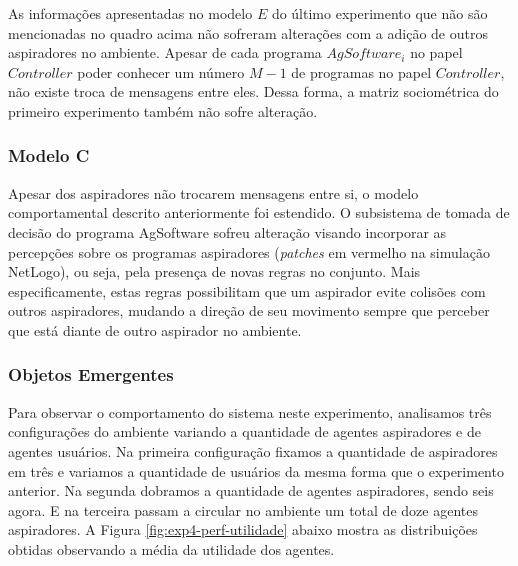 As informações apresentadas no modelo $E$ do último experimento que não são mencionadas no quadro acima não sofreram alterações com a adição  de outros aspiradores no ambiente. Apesar de cada programa $AgSoftware_i$ no papel $Controller$ poder conhecer um número $M-1$ de programas no papel $Controller$, não existe troca de mensagens entre eles. Dessa forma, a matriz sociométrica do primeiro experimento também não sofre alteração. 

\subsubsection{Modelo C}
Apesar dos aspiradores não trocarem mensagens entre si, o modelo comportamental descrito anteriormente foi estendido. O subsistema de tomada de decisão do programa AgSoftware sofreu alteração visando incorporar as percepções sobre os programas aspiradores (\textit{patches} em vermelho na simulação NetLogo), ou seja, pela presença de novas regras no conjunto. Mais especificamente, estas regras possibilitam que um aspirador evite colisões com outros aspiradores, mudando a direção de seu movimento sempre que perceber que está diante de outro aspirador no ambiente.

\subsubsection{Objetos Emergentes}

Para observar o comportamento do sistema neste experimento, analisamos três configurações do ambiente variando a quantidade de agentes aspiradores e de agentes usuários. Na primeira configuração fixamos a quantidade de aspiradores em três e variamos a quantidade de usuários da mesma forma que o experimento anterior. Na segunda dobramos a quantidade de agentes aspiradores, sendo seis agora.  E na terceira passam a circular no ambiente um total de doze agentes aspiradores. A Figura \ref{fig:exp4-perf-utilidade} abaixo mostra as distribuições obtidas observando a média da utilidade dos agentes. 

\begin{figure}[h!]
    \centering
\end{figure}

